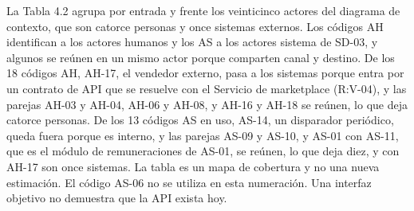 \documentclass[11pt]{article}
\begin{document}
La Tabla 4.2 agrupa por entrada y frente los veinticinco actores del diagrama de contexto, que son catorce personas y once sistemas externos. Los códigos AH identifican a los actores humanos y los AS a los actores sistema de SD-03, y algunos se reúnen en un mismo actor porque comparten canal y destino. De los 18 códigos AH, AH-17, el vendedor externo, pasa a los sistemas porque entra por un contrato de API que se resuelve con el Servicio de marketplace (R:V-04), y las parejas AH-03 y AH-04, AH-06 y AH-08, y AH-16 y AH-18 se reúnen, lo que deja catorce personas. De los 13 códigos AS en uso, AS-14, un disparador periódico, queda fuera porque es interno, y las parejas AS-09 y AS-10, y AS-01 con AS-11, que es el módulo de remuneraciones de AS-01, se reúnen, lo que deja diez, y con AH-17 son once sistemas. La tabla es un mapa de cobertura y no una nueva estimación. El código AS-06 no se utiliza en esta numeración. Una interfaz objetivo no demuestra que la API exista hoy.

\par\vspace{0pt plus 10\baselineskip}\vspace{0pt plus -10\baselineskip}
\end{document}
